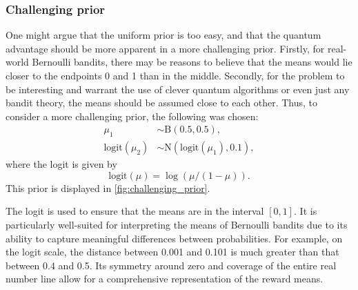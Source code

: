\subsubsection{Challenging prior}
One might argue that the uniform prior is too easy, and that the quantum advantage should be more apparent in a more challenging prior.
Firstly, for real-world Bernoulli bandits, there may be reasons to believe that the means would lie closer to the endpoints 0 and 1 than in the middle.
Secondly, for the problem to be interesting and warrant the use of clever quantum algorithms or even just any bandit theory, the means should be assumed close to each other.
Thus, to consider a more challenging prior, the following was chosen:
\begin{equation}
    \label{eq:challenging_prior}
    \begin{aligned}
        \mu_1               & \sim \text{B}(0.5, 0.5),                 \\
        \text{logit}(\mu_2) & \sim \text{N}(\text{logit}(\mu_1), 0.1),
    \end{aligned}
\end{equation}
where the logit is given by
\begin{equation}
    \label{eq:logit}
    \text{logit}(\mu) = \log(\mu/(1-\mu)).
\end{equation}
This prior is displayed in \cref{fig:challenging_prior}.

The logit is used to ensure that the means are in the interval $[0, 1]$.
It is particularly well-suited for interpreting the means of Bernoulli bandits due to its ability to capture meaningful differences between probabilities. For example, on the logit scale, the distance between 0.001 and 0.101 is much greater than that between 0.4 and 0.5.
Its symmetry around zero and coverage of the entire real number line allow for a comprehensive representation of the reward means.

